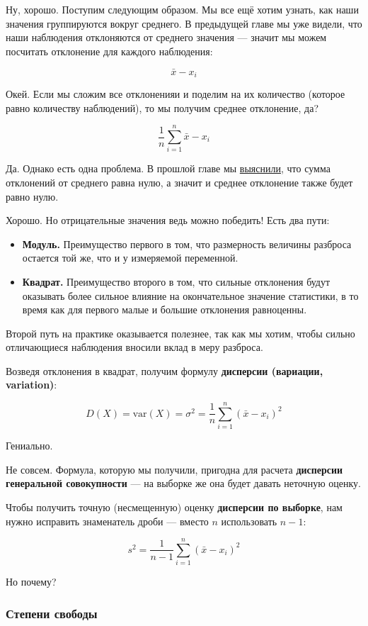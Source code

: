 \documentclass[
  letterpaper,
]{scrbook}
\providecommand{\tightlist}{%
  \setlength{\itemsep}{0pt}\setlength{\parskip}{0pt}}\usepackage{longtable,booktabs,array}
\theoremstyle{definition}
\theoremstyle{remark}
\begin{document}
Ну, хорошо. Поступим следующим образом. Мы все ещё хотим узнать, как
наши значения группируются вокруг среднего. В предыдущей главе мы уже
видели, что наши наблюдения отклоняются от среднего значения --- значит
мы можем посчитать отклонение для каждого наблюдения:

\[
\bar x - x_i
\]

Окей. Если мы сложим все отклоненияи и поделим на их количество (которое
равно количеству наблюдений), то мы получим среднее отклонение, да?

\[
\frac{1}{n} \sum_{i=1}^n \bar x - x_i
\]

Да. Однако есть одна проблема. В прошлой главе мы
\hyperref[mean_features]{выяснили}, что сумма отклонений от среднего
равна нулю, а значит и среднее отклонение также будет равно нулю.

Хорошо. Но отрицательные значения ведь можно победить! Есть два пути:

\begin{itemize}
\tightlist
\item
  \textbf{Модуль.} Преимущество первого в том, что размерность величины
  разброса остается той же, что и у измеряемой переменной.
\item
  \textbf{Квадрат.} Преимущество второго в том, что сильные отклонения
  будут оказывать более сильное влияние на окончательное значение
  статистики, в то время как для первого малые и большие отклонения
  равноценны.
\end{itemize}

Второй путь на практике оказывается полезнее, так как мы хотим, чтобы
сильно отличающиеся наблюдения вносили вклад в меру разброса.

Возведя отклонения в квадрат, получим формулу \textbf{дисперсии
(вариации, variation)}:

\[
D(X) = \mathrm{var}(X) = \sigma^2 = \frac{1}{n} \sum_{i=1}^n (\bar x - x_i)^2
\]

Гениально.

Не совсем. Формула, которую мы получили, пригодна для расчета
\textbf{дисперсии генеральной совокупности} --- на выборке же она будет
давать неточную оценку.

Чтобы получить точную (несмещенную) оценку \textbf{дисперсии по
выборке}, нам нужно исправить знаменатель дроби --- вместо \(n\)
использовать \(n-1\):

\[
s^2 = \frac{1}{n-1} \sum_{i=1}^n (\bar x - x_i)^2
\]

Но почему?

\subsubsection{Степени свободы}\label{andan-descriptives-df}
\end{document}
